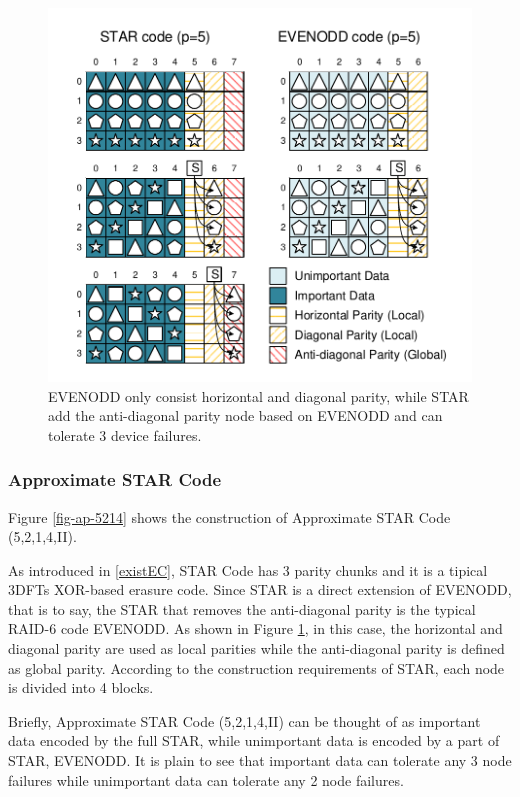 \documentclass[sigconf]{acmart}
\begin{document}
\begin{figure}[ht]
\includegraphics[width =0.8\linewidth]{photo/EVENODD-STAR-v2.pdf}
\caption{EVENODD only consist horizontal and diagonal parity, while STAR add the anti-diagonal parity node based on EVENODD and can tolerate 3 device failures.}\label{fig-star}
\end{figure}

\subsubsection{Approximate STAR Code}
Figure \ref{fig-ap-5214} shows the construction of Approximate STAR Code (5,2,1,4,II).

As introduced in \ref{existEC}, STAR Code \cite{huang2008star} has 3 parity chunks and it is a tipical 3DFTs XOR-based erasure code.
Since STAR is a direct extension of EVENODD\cite{blaum1995evenodd}, that is to say, the STAR that removes the anti-diagonal parity is the typical RAID-6 code EVENODD. As shown in Figure \ref{fig-star}, in this case, the horizontal and diagonal parity are used as local parities while the anti-diagonal parity is defined as global parity.
According to the construction requirements of STAR, each node is divided into 4 blocks.

Briefly, Approximate STAR Code (5,2,1,4,II) can be thought of as important data encoded by the full STAR, while unimportant data is encoded by a part of STAR, EVENODD. It is plain to see that important data can tolerate any 3 node failures while unimportant data can tolerate any 2 node failures.
\end{document}
